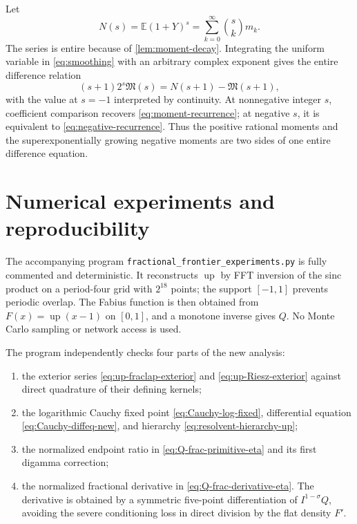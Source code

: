 \documentclass[11pt,oneside]{article}
\theoremstyle{definition}
\newcommand{\F}{F}
\newcommand{\Q}{Q}
\newcommand{\upf}{\operatorname{up}}
\newcommand{\M}{\mathfrak M}
\newcommand{\E}{\mathbb E}
\begin{document}
Let
\begin{equation}\label{eq:Ndef}
 N(s)=\E(1+Y)^s
 =\sum_{k=0}^{\infty}\binom skm_k.
\end{equation}
The series is entire because of \cref{lem:moment-decay}.  Integrating the uniform
variable in \cref{eq:smoothing} with an arbitrary complex exponent gives the entire
difference relation
\begin{equation}\label{eq:M-difference}
 (s+1)2^s\M(s)=N(s+1)-\M(s+1),
\end{equation}
with the value at \(s=-1\) interpreted by continuity.  At nonnegative integer \(s\),
coefficient comparison recovers \cref{eq:moment-recurrence}; at negative \(s\), it is
equivalent to \cref{eq:negative-recurrence}.  Thus the positive rational moments and
the superexponentially growing negative moments are two sides of one entire
difference equation.

\section{Numerical experiments and reproducibility}
\label{sec:numerics-new}\label{sec:numerics}

The accompanying program \texttt{fractional\_frontier\_experiments.py} is fully
commented and deterministic.  It reconstructs \(\upf\) by FFT inversion of the sinc
product on a period-four grid with \(2^{18}\) points; the support \([-1,1]\) prevents
periodic overlap.  The Fabius function is then obtained from
\(\F(x)=\upf(x-1)\) on \([0,1]\), and a monotone inverse gives \(\Q\).
No Monte Carlo sampling or network access is used.

The program independently checks four parts of the new analysis:
\begin{enumerate}
\item the exterior series \eqref{eq:up-fraclap-exterior} and
\eqref{eq:up-Riesz-exterior} against direct quadrature of their defining kernels;
\item the logarithmic Cauchy fixed point \eqref{eq:Cauchy-log-fixed}, differential
equation \eqref{eq:Cauchy-diffeq-new}, and hierarchy
\eqref{eq:resolvent-hierarchy-up};
\item the normalized endpoint ratio in
\eqref{eq:Q-frac-primitive-eta} and its first digamma correction;
\item the normalized fractional derivative in
\eqref{eq:Q-frac-derivative-eta}.  The derivative is obtained by a symmetric
five-point differentiation of \(I^{1-\sigma}\Q\), avoiding the severe conditioning
loss in direct division by the flat density \(\F'\).
\end{enumerate}
\end{document}

